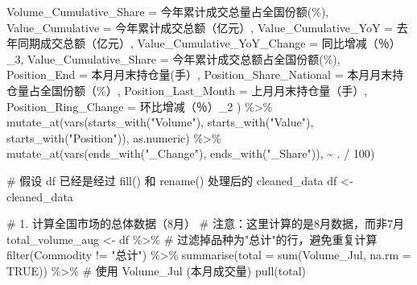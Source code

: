 \documentclass[
  letterpaper,
  DIV=11,
  numbers=noendperiod]{scrartcl}
\newenvironment{Shaded}{\begin{snugshade}}{\end{snugshade}}
\newcommand{\AttributeTok}[1]{\textcolor[rgb]{0.40,0.45,0.13}{#1}}
\newcommand{\CommentTok}[1]{\textcolor[rgb]{0.37,0.37,0.37}{#1}}
\newcommand{\ConstantTok}[1]{\textcolor[rgb]{0.56,0.35,0.01}{#1}}
\newcommand{\DecValTok}[1]{\textcolor[rgb]{0.68,0.00,0.00}{#1}}
\newcommand{\FunctionTok}[1]{\textcolor[rgb]{0.28,0.35,0.67}{#1}}
\newcommand{\NormalTok}[1]{\textcolor[rgb]{0.00,0.23,0.31}{#1}}
\newcommand{\OtherTok}[1]{\textcolor[rgb]{0.00,0.23,0.31}{#1}}
\newcommand{\SpecialCharTok}[1]{\textcolor[rgb]{0.37,0.37,0.37}{#1}}
\newcommand{\StringTok}[1]{\textcolor[rgb]{0.13,0.47,0.30}{#1}}
\begin{document}
\begin{Shaded}
\begin{Highlighting}[]
    \AttributeTok{Volume\_Cumulative\_Share =} \StringTok{\textasciigrave{}}\AttributeTok{今年累计成交总量占全国份额(\%)}\StringTok{\textasciigrave{}}\NormalTok{,}
    \AttributeTok{Value\_Cumulative =} \StringTok{\textasciigrave{}}\AttributeTok{今年累计成交总额（亿元）}\StringTok{\textasciigrave{}}\NormalTok{,}
    \AttributeTok{Value\_Cumulative\_YoY =} \StringTok{\textasciigrave{}}\AttributeTok{去年同期成交总额（亿元）}\StringTok{\textasciigrave{}}\NormalTok{,}
    \AttributeTok{Value\_Cumulative\_YoY\_Change =} \StringTok{\textasciigrave{}}\AttributeTok{同比增减（％）\_3}\StringTok{\textasciigrave{}}\NormalTok{,}
    \AttributeTok{Value\_Cumulative\_Share =} \StringTok{\textasciigrave{}}\AttributeTok{今年累计成交总额占全国份额(\%)}\StringTok{\textasciigrave{}}\NormalTok{,}
    \AttributeTok{Position\_End =} \StringTok{\textasciigrave{}}\AttributeTok{本月月末持仓量(手）}\StringTok{\textasciigrave{}}\NormalTok{,}
    \AttributeTok{Position\_Share\_National =} \StringTok{\textasciigrave{}}\AttributeTok{本月月末持仓量占全国份额（\%）}\StringTok{\textasciigrave{}}\NormalTok{,}
    \AttributeTok{Position\_Last\_Month =} \StringTok{\textasciigrave{}}\AttributeTok{上月月末持仓量（手）}\StringTok{\textasciigrave{}}\NormalTok{,}
    \AttributeTok{Position\_Ring\_Change =} \StringTok{\textasciigrave{}}\AttributeTok{环比增减（％）\_2}\StringTok{\textasciigrave{}}
\NormalTok{  ) }\SpecialCharTok{\%\textgreater{}\%}
  \FunctionTok{mutate\_at}\NormalTok{(}\FunctionTok{vars}\NormalTok{(}\FunctionTok{starts\_with}\NormalTok{(}\StringTok{"Volume"}\NormalTok{), }\FunctionTok{starts\_with}\NormalTok{(}\StringTok{"Value"}\NormalTok{), }\FunctionTok{starts\_with}\NormalTok{(}\StringTok{"Position"}\NormalTok{)), as.numeric) }\SpecialCharTok{\%\textgreater{}\%}
  \FunctionTok{mutate\_at}\NormalTok{(}\FunctionTok{vars}\NormalTok{(}\FunctionTok{ends\_with}\NormalTok{(}\StringTok{"\_Change"}\NormalTok{), }\FunctionTok{ends\_with}\NormalTok{(}\StringTok{"\_Share"}\NormalTok{)), }\SpecialCharTok{\textasciitilde{}}\NormalTok{ . }\SpecialCharTok{/} \DecValTok{100}\NormalTok{)}

\CommentTok{\# 假设 df 已经是经过 fill() 和 rename() 处理后的 cleaned\_data}
\NormalTok{df }\OtherTok{\textless{}{-}}\NormalTok{ cleaned\_data}

\CommentTok{\# 1. 计算全国市场的总体数据（8月）}
\CommentTok{\# 注意：这里计算的是8月数据，而非7月}
\NormalTok{total\_volume\_aug }\OtherTok{\textless{}{-}}\NormalTok{ df }\SpecialCharTok{\%\textgreater{}\%}
  \CommentTok{\# 过滤掉品种为"总计"的行，避免重复计算}
  \FunctionTok{filter}\NormalTok{(Commodity }\SpecialCharTok{!=} \StringTok{"总计"}\NormalTok{) }\SpecialCharTok{\%\textgreater{}\%}
  \FunctionTok{summarise}\NormalTok{(}\AttributeTok{total =} \FunctionTok{sum}\NormalTok{(Volume\_Jul, }\AttributeTok{na.rm =} \ConstantTok{TRUE}\NormalTok{)) }\SpecialCharTok{\%\textgreater{}\%}  \CommentTok{\# 使用 Volume\_Jul (本月成交量)}
  \FunctionTok{pull}\NormalTok{(total)}


\end{Highlighting}
\end{Shaded}
\end{document}
